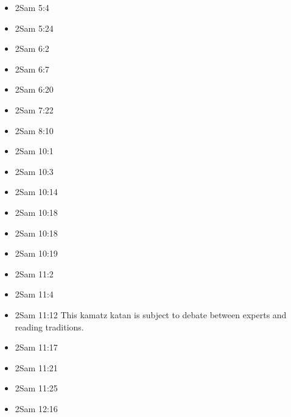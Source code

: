 \documentclass[14pt]{article}
\begin{document}
\begin{multicols}{2}
\begin{itemize}
							\item 2Sam 5:4
							
							\item 2Sam 5:24
							
							\item 2Sam 6:2
							
							\item 2Sam 6:7
							
							\item 2Sam 6:20
							
							\item 2Sam 7:22
							
							\item 2Sam 8:10
							
							\item 2Sam 10:1
							
							\item 2Sam 10:3
							
							\item 2Sam 10:14
							
							\item 2Sam 10:18
							
							\item 2Sam 10:18
							
							\item 2Sam 10:19
							
							\item 2Sam 11:2
							
							\item 2Sam 11:4
							
							\item 2Sam 11:12 This kamatz katan is subject to debate between experts and reading traditions.
							
							\item 2Sam 11:17
							
							\item 2Sam 11:21
							
							\item 2Sam 11:25
							
							\item 2Sam 12:16
							

\end{itemize}
\end{multicols}
\end{document}
